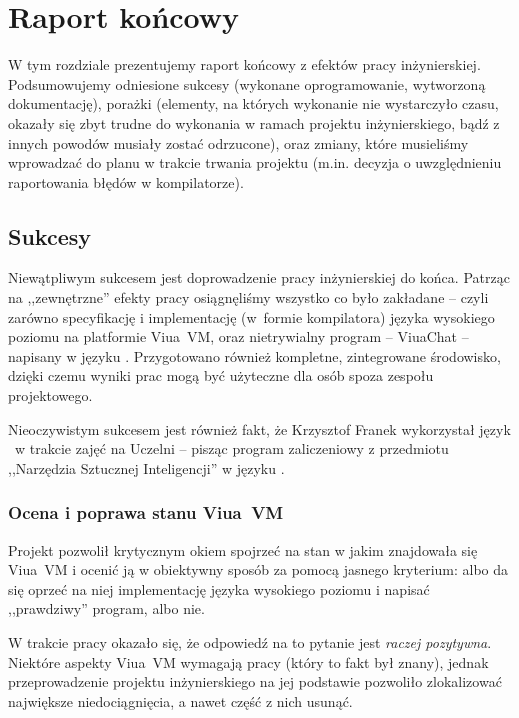 \chapter{Raport końcowy}
\label{raport_koncowy}

W tym rozdziale prezentujemy raport końcowy z efektów pracy inżynierskiej.
Podsumowujemy odniesione sukcesy (wykonane oprogramowanie, wytworzoną dokumentację), porażki (elementy, na
których wykonanie nie wystarczyło czasu, okazały się zbyt trudne do wykonania w ramach projektu
inżynierskiego, bądź z innych powodów musiały zostać odrzucone), oraz zmiany, które musieliśmy wprowadzać do
planu w trakcie trwania projektu (m.in. decyzja o uwzględnieniu raportowania błędów w kompilatorze).

\section{Sukcesy}

Niewątpliwym sukcesem jest doprowadzenie pracy inżynierskiej do końca. Patrząc
na ,,zewnętrzne'' efekty pracy osiągnęliśmy wszystko co było zakładane -- czyli
zarówno specyfikację i implementację (w~formie kompilatora) języka wysokiego
poziomu na platformie Viua~VM, oraz nietrywialny program -- ViuaChat -- napisany
w języku \ViuAct. Przygotowano również kompletne, zintegrowane środowisko,
dzięki czemu wyniki prac mogą być użyteczne dla osób spoza zespołu projektowego.

Nieoczywistym sukcesem jest również fakt, że Krzysztof Franek wykorzystał język
\ViuAct\ w trakcie zajęć na Uczelni -- pisząc program zaliczeniowy z
przedmiotu ,,Narzędzia Sztucznej Inteligencji'' w języku \ViuAct.

\subsection{Ocena i poprawa stanu Viua~VM}

Projekt pozwolił krytycznym okiem spojrzeć na stan w jakim znajdowała się
Viua~VM i ocenić ją w obiektywny sposób za pomocą jasnego kryterium: albo da się
oprzeć na niej implementację języka wysokiego poziomu i napisać ,,prawdziwy''
program, albo nie.

W trakcie pracy okazało się, że odpowiedź na to pytanie jest \emph{raczej
pozytywna}. Niektóre aspekty Viua~VM wymagają pracy (który to fakt był znany),
jednak przeprowadzenie projektu inżynierskiego na jej podstawie pozwoliło
zlokalizować największe niedociągnięcia, a nawet część z nich usunąć.

